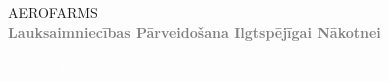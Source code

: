 \documentclass[a4paper]{article}
\begin{document}
	\pagestyle{empty}
	
	\begin{tcolorbox}[colback=white, boxrule=0pt, top=0cm, bottom=0cm]
		\begin{center}
			{\fontsize{30}{36}\selectfont \textcolor{aeroblue}{AERO}\textcolor{aerogreen}{FARMS}\textsuperscript{\textregistered}}\\[0.5cm]
			{\large\bfseries\textcolor{gray}{Lauksaimniecības Pārveidošana Ilgtspējīgai Nākotnei}}
		\end{center}
	\end{tcolorbox}
	
	\begin{tcolorbox}[colback=aeroblue, boxrule=0pt, top=0.1cm, bottom=0.1cm]
		\begin{center}
			{\large\itshape\textcolor{white}{"Labāko iespējamo augu audzēšana cilvēces uzlabošanai"}}
		\end{center}
	\end{tcolorbox}
	
\end{document}
